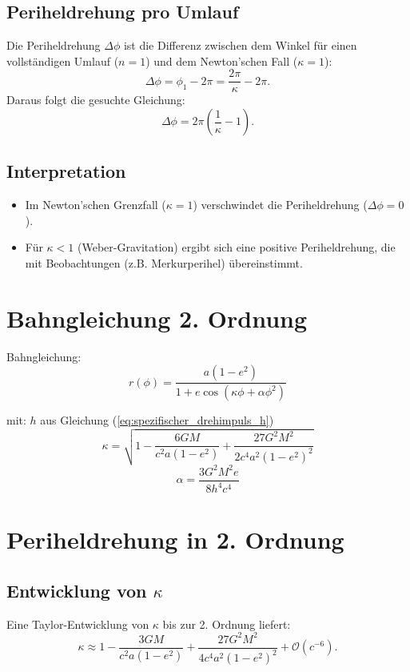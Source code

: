 \subsection{Periheldrehung pro Umlauf}
Die Periheldrehung $\Delta\phi$ ist die Differenz zwischen dem Winkel für einen vollständigen Umlauf ($n = 1$) und dem Newton'schen Fall ($\kappa = 1$):
\begin{equation}
\Delta\phi = \phi_1 - 2\pi = \frac{2\pi}{\kappa} - 2\pi.
\end{equation}
Daraus folgt die gesuchte Gleichung:
\begin{equation}
\boxed{\Delta\phi = 2\pi\left(\frac{1}{\kappa} - 1\right)}.
\end{equation}

\subsection{Interpretation}
\begin{itemize}
\item Im Newton'schen Grenzfall ($\kappa = 1$) verschwindet die Periheldrehung ($\Delta\phi = 0$).
\item Für $\kappa < 1$ (Weber-Gravitation) ergibt sich eine positive Periheldrehung, die mit Beobachtungen (z.B. Merkurperihel) übereinstimmt.
\end{itemize}

\section{Bahngleichung 2. Ordnung}
Bahngleichung:
\begin{equation}
    \boxed
    {
        r(\phi) = \frac{a(1-e^2)}{1 + e\cos\left(\kappa\phi + \alpha\phi^2\right)}
    }
\end{equation}

mit:
$h$ aus Gleichung (\ref{eq:spezifischer_drehimpuls_h})
\begin{equation}
\label{eq:kappa_2_ordnung}
\kappa = \sqrt{1 - \frac{6GM}{c^2a(1-e^2)} + \frac{27G^2M^2}{2c^4a^2(1-e^2)^2}}
\end{equation}
\begin{equation}
\label{eq:alpha}
\alpha = \frac{3G^2M^2e}{8h^4c^4}
\end{equation}

\section{Periheldrehung in 2. Ordnung}
\subsection{Entwicklung von $\kappa$}
Eine Taylor-Entwicklung von $\kappa$ bis zur 2. Ordnung liefert:
\begin{equation}
\kappa \approx 1 - \frac{3GM}{c^2 a(1 - e^2)} + \frac{27G^2 M^2}{4c^4 a^2 (1 - e^2)^2} + \mathcal{O}(c^{-6}).
\end{equation}

